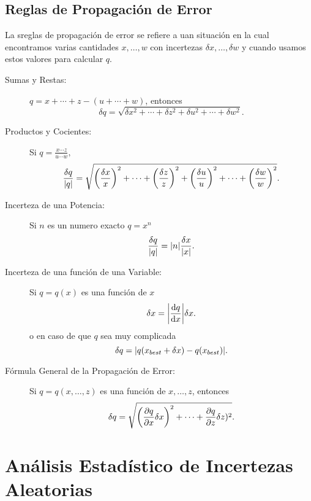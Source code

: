 \subsection{Reglas de Propagación de Error}
La sreglas de propagación de error se refiere a uan situación en la cual encontramos varias cantidades $x,\ldots,w$ con incertezas $\delta x, \ldots ,\delta w$ y cuando usamos estos valores para calcular $q$. 
\begin{tcolorbox}
	\begin{description}
		\item[Sumas y Restas: ] $q = x + \cdots + z - (u + \cdots + w)$, entonces
			\begin{equation}
				\delta q = \sqrt{\delta x ^2 + \cdots + \delta z ^2 + \delta u ^2 + \cdots + \delta w^2}.
			\end{equation}
		\item[Productos y Cocientes: ] Si $q = \frac{x\cdots z}{u \cdots w},$
			\begin{equation}
				\frac{\delta q}{\abs{q}} = \sqrt{\qty(\frac{\delta x}{x})^2 + \cdots + \qty(\frac{\delta z}{z})^2 + \qty(\frac{\delta u}{u})^2 + \cdots + \qty(\frac{\delta w}{w})^2}.
			\end{equation}
		\item[Incerteza de una Potencia: ] Si $n$ es un numero exacto $q = x^n$
			\begin{equation}
				\frac{\delta q}{\abs{q}} = \abs{n} \frac{\delta x}{\abs{x}}.
			\end{equation}
		\item[Incerteza de una función de una Variable: ] Si $q = q(x)$ es una función de $x$
			\begin{equation}
				\delta x = \abs{\dv{q}{x}} \delta x.
			\end{equation}
		o en caso de que $q$ sea muy complicada
			\begin{equation}
				\delta q = \abs{q(x_{best} + \delta x) - q(x_{best})}.
			\end{equation}
		\item[Fórmula General de la Propagación de Error: ] Si $q = q(x,\ldots ,z)$ es una función de $x,\ldots ,z$, entonces
			\begin{equation}
				\delta q = \sqrt{\qty(\pdv{q}{x} \delta x)^2 + \cdots + \pdv{q}{z} \delta z)^2}.
			\end{equation}
	\end{description}
\end{tcolorbox}


\section{Análisis Estadístico de Incertezas Aleatorias}
